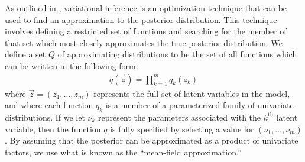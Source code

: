 \documentclass{article}
\newcommand{\nth}{^{\text{th}}}
\begin{document}


As outlined in \cite{blei2017variational}, variational inference is an optimization technique that can be used to find an approximation to the posterior distribution.
This technique involves defining a restricted set of functions and searching for the member of that set which most closely approximates the true posterior distribution.
We define a set $Q$ of approximating distributions to be the set of all functions which can be written in the following form:
\begin{align}
q(\vec z) = \prod_{k=1}^m q_k(z_k)
\end{align}
where $\vec z = (z_1, \ldots, z_m)$ represents the full set of latent variables in the model, and where each function $q_k$ is a member of a parameterized family of univariate distributions.
If we let $\nu_k$ represent the parameters associated with the $k\nth$ latent variable, then the function $q$ is fully specified by selecting a value for $(\nu_1, \ldots, \nu_m)$.
By assuming that the posterior can be approximated as a product of univariate factors, we use what is known as the ``mean-field approximation.''
\end{document}
